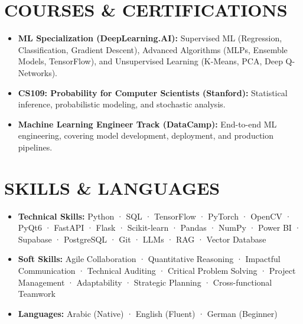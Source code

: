 \documentclass[letterpaper,12pt]{extarticle}
\begin{document}
\section{COURSES \& CERTIFICATIONS}
\begin{itemize}[leftmargin=0.15in, label={}, itemsep=3pt]
    \item \textbf{ML Specialization (DeepLearning.AI):} Supervised ML (Regression, Classification, Gradient Descent), Advanced Algorithms (MLPs, Ensemble Models, TensorFlow), and Unsupervised Learning (K-Means, PCA, Deep Q-Networks).
    \item \textbf{CS109: Probability for Computer Scientists (Stanford):} Statistical inference, probabilistic modeling, and stochastic analysis.
    \item \textbf{Machine Learning Engineer Track (DataCamp):} End-to-end ML engineering, covering model development, deployment, and production pipelines.
\end{itemize}

\section{SKILLS \& LANGUAGES}
\begin{itemize}[leftmargin=0.15in, label={}, itemsep=4pt]
    \item \textbf{Technical Skills:} Python · SQL · TensorFlow · PyTorch · OpenCV · PyQt6 · FastAPI · Flask · Scikit-learn · Pandas · NumPy · Power BI · Supabase · PostgreSQL · Git · LLMs · RAG · Vector Database
    \item \textbf{Soft Skills:} Agile Collaboration · Quantitative Reasoning · Impactful Communication · Technical Auditing · Critical Problem Solving · Project Management · Adaptability · Strategic Planning · Cross-functional Teamwork
    \item \textbf{Languages:} Arabic (Native) · English (Fluent) · German (Beginner)
\end{itemize}

\end{document}
